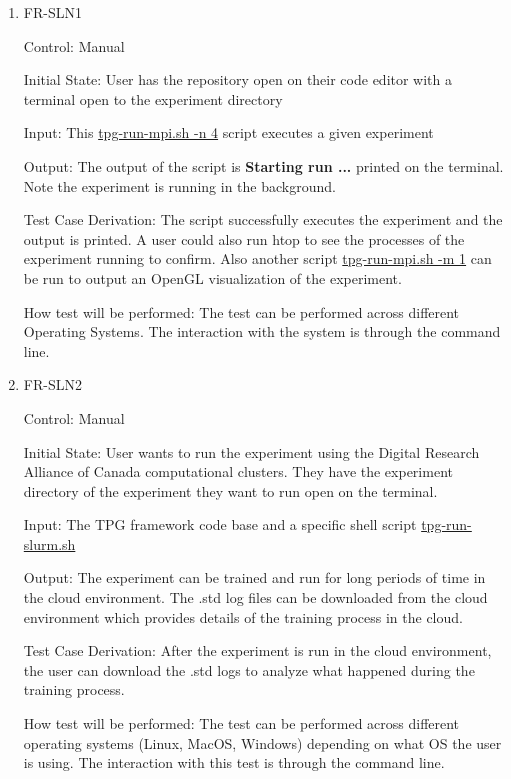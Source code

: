 \documentclass[12pt, titlepage]{article}
\begin{document}
\begin{enumerate}

\item{FR-SLN1}

Control: Manual
					
Initial State: User has the repository open on their code editor with a terminal open to the experiment directory
					
Input: This \href{https://github.com/TPGEngine/tpg/blob/main/src/scripts/run/tpg-run-mpi.sh}{tpg-run-mpi.sh -n 4} script executes a given experiment
					
Output: The output of the script is \textbf{Starting run ...} printed on the terminal. Note the experiment is running in the background.

Test Case Derivation: The script successfully executes the experiment and the output is printed. A user could also run htop to see the processes of the experiment running to confirm. Also another script \href{https://github.com/TPGEngine/tpg/blob/main/src/scripts/run/tpg-run-mpi.sh}{tpg-run-mpi.sh -m 1} can be run to output an OpenGL visualization of the experiment. 

How test will be performed: The test can be performed across different Operating Systems. The interaction with the system is through the command line.
					
\item{FR-SLN2}

Control: Manual
					
Initial State: User wants to run the experiment using the Digital Research Alliance of Canada computational clusters. They have the experiment directory of the experiment they want to run open on the terminal.
					
Input: The TPG framework code base and a specific shell script \href{https://github.com/TPGEngine/tpg/blob/main/src/scripts/run/tpg-run-slurm.sh}{tpg-run-slurm.sh}
					
Output: The experiment can be trained and run for long periods of time in the cloud environment. The .std log files can be downloaded from the cloud environment which provides details of the training process in the cloud.

Test Case Derivation: After the experiment is run in the cloud environment, the user can download the .std logs to analyze what happened during the training process.

How test will be performed: The test can be performed across different operating systems (Linux, MacOS, Windows) depending on what OS the user is using. The interaction with this test is through the command line.

\end{enumerate}
\end{document}
